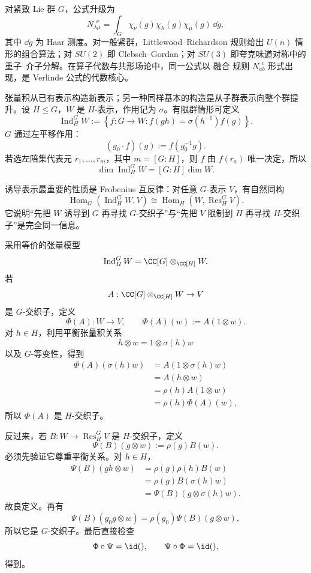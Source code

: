 对紧致 Lie 群 $G$，公式升级为
\[
N_{\lambda\mu}^{\ \ \nu}
=\int_G \overline{\chi_\nu(g)}\chi_\lambda(g)\chi_\mu(g)\,\dd g,
\]
其中 $\dd g$ 为 Haar 测度。对一般紧群，Littlewood--Richardson 规则给出 $U(n)$ 情形的组合算法；对 $SU(2)$ 即 Clebsch--Gordan；对 $SU(3)$ 即夸克味道对称中的重子--介子分解。在算子代数与共形场论中，同一公式以 融合 规则 $N_{ab}^{\ \ c}$ 形式出现，是 Verlinde 公式的代数核心。

张量积从已有表示构造新表示；另一种同样基本的构造是从子群表示向整个群提升。设 $H\le G$，$W$ 是 $H$-表示，作用记为 $\sigma$。有限群情形可定义
\[
\operatorname{Ind}_H^G W
:=\left\{
 f:G\to W:
 f(gh)=\sigma(h^{-1})f(g)
\right\}.
\]
$G$ 通过左平移作用：
\[
(g_0\cdot f)(g)
:=f(g_0^{-1}g).
\]
若选左陪集代表元 $r_1,\ldots,r_m$，其中 $m=[G:H]$，则 $f$ 由 $f(r_a)$ 唯一决定，所以
\[
\dim\operatorname{Ind}_H^G W
=[G:H]\dim W.
\]

诱导表示最重要的性质是 Frobenius 互反律：对任意 $G$-表示 $V$，有自然同构
\begin{equation}
{
\operatorname{Hom}_G(\operatorname{Ind}_H^G W,V)
\cong
\operatorname{Hom}_H(W,\operatorname{Res}_H^G V)
}.
\label{eq:frobenius-reciprocity}
\end{equation}
它说明“先把 $W$ 诱导到 $G$ 再寻找 $G$-交织子”与“先把 $V$ 限制到 $H$ 再寻找 $H$-交织子”是完全同一信息。

采用等价的张量模型
\[
\operatorname{Ind}_H^G W
=\CC[G]\otimes_{\CC[H]}W.
\]
若
\[
A:\CC[G]\otimes_{\CC[H]}W\to V
\]
是 $G$-交织子，定义
\[
\Phi(A):W\to V,
\qquad
\Phi(A)(w):=A(1\otimes w).
\]
对 $h\in H$，利用平衡张量积关系
\[
h\otimes w=1\otimes\sigma(h)w
\]
以及 $G$-等变性，得到
\[
\begin{aligned}
\Phi(A)(\sigma(h)w)
&=A(1\otimes\sigma(h)w)\\
&=A(h\otimes w)\\
&=\rho(h)A(1\otimes w)\\
&=\rho(h)\Phi(A)(w),
\end{aligned}
\]
所以 $\Phi(A)$ 是 $H$-交织子。

反过来，若 $B:W\to\operatorname{Res}_H^G V$ 是 $H$-交织子，定义
\[
\Psi(B)(g\otimes w)
:=\rho(g)B(w).
\]
必须先验证它尊重平衡关系。对 $h\in H$，
\[
\begin{aligned}
\Psi(B)(gh\otimes w)
&=\rho(g)\rho(h)B(w)\\
&=\rho(g)B(\sigma(h)w)\\
&=\Psi(B)(g\otimes\sigma(h)w).
\end{aligned}
\]
故良定义。再有
\[
\Psi(B)(g_0g\otimes w)
=\rho(g_0)\Psi(B)(g\otimes w),
\]
所以它是 $G$-交织子。最后直接检查
\[
\Phi\circ\Psi=\id(),
\qquad
\Psi\circ\Phi=\id(),
\]
得到。

